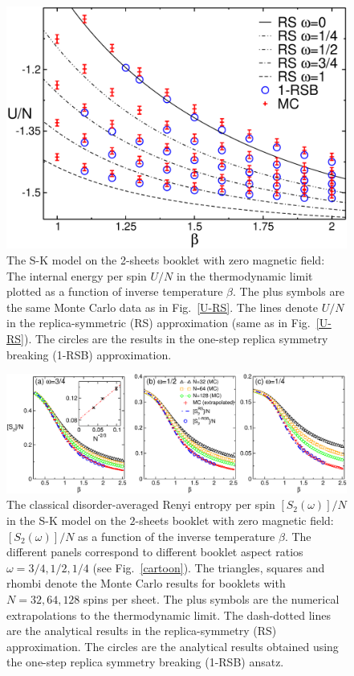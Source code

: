 \documentclass[twocolumn,superscriptaddress,prb,10pt]{revtex4-1}
\begin{document}
\begin{figure}[t]
\includegraphics*[width=0.93\linewidth]{./draft_figs/U_extrapolated_v1}
\caption{
 The S-K model on the 2-sheets booklet with zero magnetic field: 
 The internal energy per spin $U/N$ in the thermodynamic limit plotted 
 as a function of inverse temperature $\beta$. The plus symbols are the same 
 Monte Carlo data as in Fig.~\ref{U-RS}. The lines denote $U/N$ 
 in the replica-symmetric (RS) approximation (same as in Fig.~\ref{U-RS}). 
 The circles are the results  in the one-step replica symmetry breaking 
 (1-RSB) approximation.
}
\label{U-RSB-1}
\end{figure}


\begin{figure}[t]
\includegraphics*[width=0.93\linewidth]{./draft_figs/Renyi_MC_v2}
\caption{ The classical disorder-averaged Renyi entropy per spin $[S_2(\omega)]/N$  
 in the S-K model on the $2$-sheets booklet with zero magnetic field: 
 $[S_2(\omega)]/N$ as a function of the inverse temperature $\beta$. The different panels 
 correspond to different booklet aspect ratios $\omega=3/4,1/2,1/4$ (see Fig.~\ref{cartoon}). 
 The triangles, squares and rhombi denote the Monte Carlo results for 
 booklets with $N=32,64,128$ spins per sheet. The plus symbols are the numerical 
 extrapolations to the thermodynamic limit. The dash-dotted lines are the  
 analytical results in the replica-symmetry (RS) approximation. 
 The circles are the analytical results obtained 
 using the one-step replica symmetry breaking (1-RSB) ansatz.
}
\label{Renyi-MC}
\end{figure}
\end{document}
